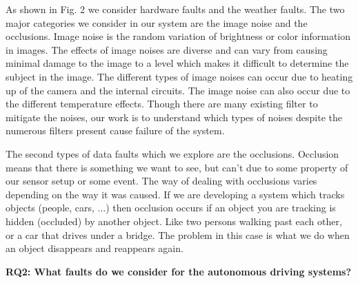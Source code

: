 As shown in Fig. 2 we consider hardware faults and the weather faults. The two major categories we consider in our system are the image noise and the occlusions. Image noise is the random variation of brightness or color information in images.
The effects of image noises are diverse and can vary from causing minimal damage to the image to
a level which makes it difficult to determine the subject in the image. The different types of image noises can occur due to heating up of the camera and the internal circuits. The image noise can also occur due to the different temperature effects. Though there are many existing filter to mitigate the noises, our work is to understand which types of noises despite the numerous filters present cause failure of the system. 

The second types of data faults which we explore are the occlusions. Occlusion means that there is something we want to see, but can't due to some property of our sensor setup or some event. The way of dealing with occlusions varies depending on the way it was caused. If we are developing a system which tracks objects (people, cars, ...) then occlusion occurs if an object you are tracking is hidden (occluded) by another object. Like two persons walking past each other, or a car that drives under a bridge. The problem in this case is what we do when an object disappears and reappears again.

\textbf{RQ2: What faults do we consider for the autonomous driving systems?}




